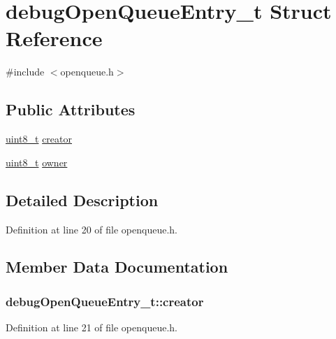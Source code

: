 \hypertarget{structdebug_open_queue_entry__t}{}\section{debug\+Open\+Queue\+Entry\+\_\+t Struct Reference}
\label{structdebug_open_queue_entry__t}


{\ttfamily \#include $<$openqueue.\+h$>$}

\subsection*{Public Attributes}
\begin{DoxyCompactItemize}
\item 
\hyperlink{_p_e___types_8h_aba7bc1797add20fe3efdf37ced1182c5}{uint8\+\_\+t} \hyperlink{structdebug_open_queue_entry__t_ad9479e06e85f701f2e7690ad4dc64461}{creator}
\item 
\hyperlink{_p_e___types_8h_aba7bc1797add20fe3efdf37ced1182c5}{uint8\+\_\+t} \hyperlink{structdebug_open_queue_entry__t_a4cd0aa56afe5989669c82e9527e9024f}{owner}
\end{DoxyCompactItemize}


\subsection{Detailed Description}


Definition at line 20 of file openqueue.\+h.



\subsection{Member Data Documentation}
\subsubsection[{\texorpdfstring{creator}{creator}}]{ debug\+Open\+Queue\+Entry\+\_\+t\+::creator}\hypertarget{structdebug_open_queue_entry__t_ad9479e06e85f701f2e7690ad4dc64461}{}\label{structdebug_open_queue_entry__t_ad9479e06e85f701f2e7690ad4dc64461}


Definition at line 21 of file openqueue.\+h.

